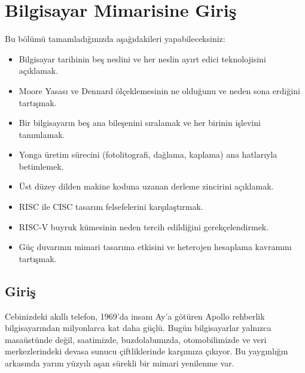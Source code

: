 ﻿%
\chapter{Bilgisayar Mimarisine Giriş}
\label{chap:giris}

\begin{tcolorbox}[
    colback=blokyesil!15,
    colframe=sinyalyesil!60!black,
    title={\textbf{Öğrenme Hedefleri}},
    fonttitle=\bfseries,
    rounded corners,
    boxrule=0.8pt
]
Bu bölümü tamamladığınızda aşağıdakileri yapabileceksiniz:
\begin{itemize}[nosep, leftmargin=*]
    \item Bilgisayar tarihinin beş neslini ve her neslin ayırt edici teknolojisini açıklamak.
    \item Moore Yasası ve Dennard ölçeklemesinin ne olduğunu ve neden sona erdiğini tartışmak.
    \item Bir bilgisayarın beş ana bileşenini sıralamak ve her birinin işlevini tanımlamak.
    \item Yonga üretim sürecini (fotolitografi, dağlama, kaplama) ana hatlarıyla betimlemek.
    \item Üst düzey dilden makine koduna uzanan derleme zincirini açıklamak.
    \item RISC ile CISC tasarım felsefelerini karşılaştırmak.
    \item RISC-V buyruk kümesinin neden tercih edildiğini gerekçelendirmek.
    \item Güç duvarının mimari tasarıma etkisini ve heterojen hesaplama kavramını tartışmak.
\end{itemize}
\end{tcolorbox}

\section{Giriş}
\label{sec:giris}

Cebinizdeki akıllı telefon, 1969'da insanı Ay'a götüren Apollo rehberlik bilgisayarından milyonlarca kat daha güçlü. Bugün bilgisayarlar yalnızca masaüstünde değil, saatimizde, buzdolabımızda, otomobilimizde ve veri merkezlerindeki devasa sunucu çiftliklerinde karşımıza çıkıyor. Bu yaygınlığın arkasında yarım yüzyılı aşan sürekli bir mimari yenilenme var.

